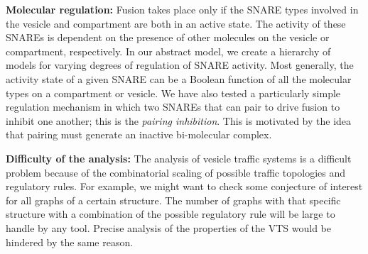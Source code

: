 \textbf{Molecular regulation:} 
Fusion takes place only if the SNARE types involved in the vesicle and compartment are both in an active state.
%
The activity of these SNAREs is dependent on the presence of other molecules on the vesicle or compartment, respectively.
%
In our abstract model, 
we create a hierarchy of models for varying degrees of regulation of SNARE activity.
%
Most generally, the activity state of a given SNARE can be a Boolean function of all the molecular types on a compartment or vesicle. 
%
We have also tested \cite{shukla} a particularly simple regulation mechanism in which two SNAREs that can pair to drive fusion to inhibit one another; this is the \textit{pairing inhibition}. 
%
This is motivated by the idea that pairing must generate an inactive bi-molecular complex.
%


\textbf{Difficulty of the analysis:}
The analysis of vesicle traffic systems is a difficult problem
because of the combinatorial scaling of possible traffic topologies and regulatory rules. 
%
For example, we might want to check some conjecture of interest for all graphs of a certain structure. 
%
The number of graphs with that specific structure with a combination of the possible regulatory rule will be large to handle by any tool.
%
Precise analysis of the properties of the VTS would be hindered by the same reason. 
%
%

